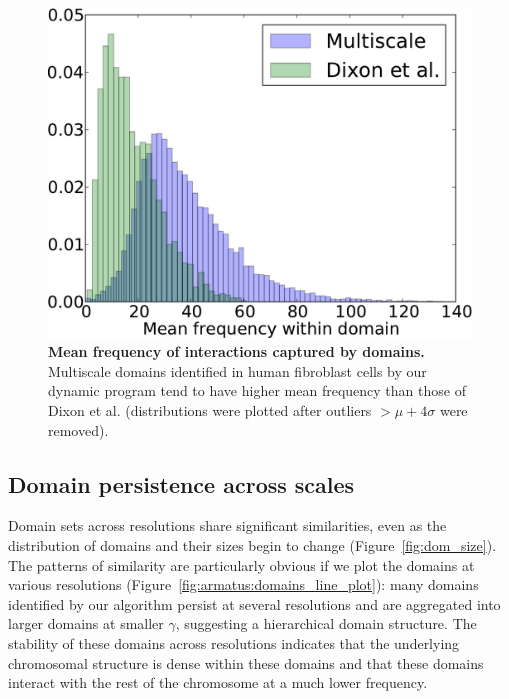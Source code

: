 \documentclass[12pt]{cmuthesis}
\begin{document}
  \begin{figure}[ht]
    \centering
      \includegraphics[width=0.6\linewidth]{figures/mean-freq-distr}
      \caption{\textbf{Mean frequency of interactions captured by domains.} Multiscale domains identified in human fibroblast cells by our dynamic program tend to have higher mean frequency than those of Dixon et al. (distributions were plotted after outliers $> \mu+4\sigma$ were removed).}
      \label{fig:armatus:freq-distr}
  \end{figure}



  \subsection{Domain persistence across scales}

  Domain sets across resolutions share significant similarities, even as the distribution of domains and their sizes begin to change (Figure~\ref{fig:dom_size}). The patterns of similarity are particularly obvious if we plot the domains at various resolutions (Figure~\ref{fig:armatus:domains_line_plot}): many domains identified by our algorithm persist at several resolutions and are aggregated into larger domains at smaller $\gamma$, suggesting a hierarchical domain structure. The stability of these domains across resolutions indicates that the underlying chromosomal structure is dense within these domains and that these domains interact with the rest of the chromosome at a much lower frequency.
\end{document}
